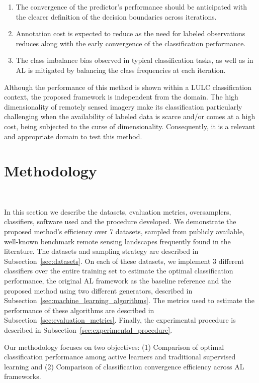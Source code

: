 \documentclass[parskip=full]{scrartcl}
\begin{document}
\begin{enumerate}
    \item The convergence of the predictor's performance should be anticipated
        with the clearer definition of the decision boundaries across
        iterations.
    \item Annotation cost is expected to reduce as the need for labeled
        observations reduces along with the early convergence of the
        classification performance.
    \item The class imbalance bias observed in typical classification tasks, as
        well as in AL is mitigated by balancing the class frequencies at each
        iteration.
\end{enumerate}

Although the performance of this method is shown within a LULC classification
context, the proposed framework is independent from the domain. The high
dimensionality of remotely sensed imagery make its classification particularly
challenging when the availability of labeled data is scarce and/or comes at a
high cost, being subjected to the curse of dimensionality. Consequently, it is
a relevant and appropriate domain to test this method.

\section{Methodology}~\label{sec:methodology}

In this section we describe the datasets, evaluation metrics, oversamplers,
classifiers, software used and the procedure developed. We demonstrate the
proposed method's efficiency over 7 datasets, sampled from publicly available,
well-known benchmark remote sensing landscapes frequently found in the
literature. The datasets and sampling strategy are described in
Subsection~\ref{sec:datasets}. On each of these datasets, we implement 3
different classifiers over the entire training set to estimate the optimal
classification performance, the original AL framework as the baseline
reference and the proposed method using two different generators, described in
Subsection~\ref{sec:machine_learning_algorithms}. The metrics used to estimate
the performance of these algorithms are described in
Subsection~\ref{sec:evaluation_metrics}. Finally, the experimental procedure is
described in Subsection~\ref{sec:experimental_procedure}. 

Our methodology focuses on two objectives: (1) Comparison of optimal
classification performance among active learners and traditional supervised
learning and (2) Comparison of classification convergence efficiency across AL
frameworks.
\end{document}
